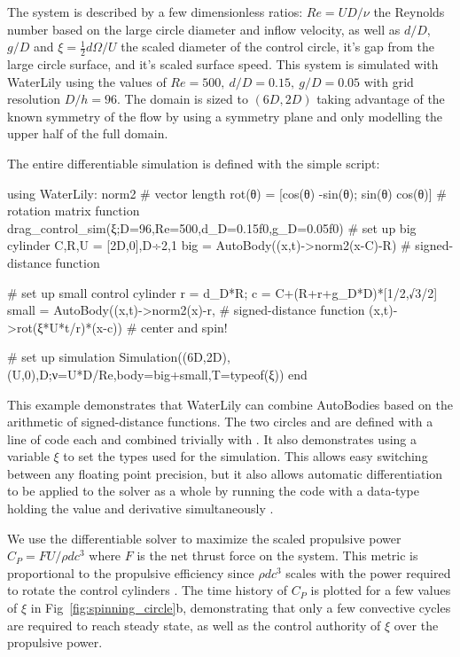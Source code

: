 \documentclass[final,3p,times]{elsarticle}
\begin{document}
The system is described by a few dimensionless ratios: $Re=UD/\nu$ the Reynolds number based on the large circle diameter and inflow velocity, as well as $d/D$, $g/D$ and $\xi=\frac 12 d\Omega/U$ the scaled diameter of the control circle, it's gap from the large circle surface, and it's scaled surface speed. This system is simulated with WaterLily using the values of $Re=500,\ d/D=0.15,\ g/D=0.05$ with grid resolution $D/h=96$. The domain is sized to $(6D,2D)$ taking advantage of the known symmetry of the flow by using a symmetry plane and only modelling the upper half of the full domain.

The entire differentiable simulation is defined with the simple script:
\begin{jllisting}
using WaterLily: norm2                   # vector length
rot(θ) = [cos(θ) -sin(θ); sin(θ) cos(θ)] # rotation matrix
function drag_control_sim(ξ;D=96,Re=500,d_D=0.15f0,g_D=0.05f0)
    # set up big cylinder
    C,R,U = [2D,0],D÷2,1
    big = AutoBody((x,t)->norm2(x-C)-R)         # signed-distance function

    # set up small control cylinder
    r = d_D*R; c = C+(R+r+g_D*D)*[1/2,√3/2]
    small = AutoBody((x,t)->norm2(x)-r,         # signed-distance function
                     (x,t)->rot(ξ*U*t/r)*(x-c)) # center and spin!

    # set up simulation
    Simulation((6D,2D),(U,0),D;ν=U*D/Re,body=big+small,T=typeof(ξ))
end
\end{jllisting}
This example demonstrates that WaterLily can combine AutoBodies based on the arithmetic of signed-distance functions. The two circles  and  are defined with a line of code each and combined trivially with . It also demonstrates using a variable $\xi$ to set the types used for the simulation. This allows easy switching between any floating point precision, but it also allows automatic differentiation to be applied to the solver as a whole by running the code with a  data-type holding the value and derivative simultaneously \cite{RevelsLubinPapamarkou2016}.

We use the differentiable solver to maximize the scaled propulsive power $C_P = FU/\rho dc^3$ where $F$ is the net thrust force on the system. This metric is  proportional to the propulsive efficiency since $\rho dc^3$ scales with the power required to rotate the control cylinders \cite{schulmeister2017}. The time history of $C_P$ is plotted for a few values of $\xi$ in Fig~\ref{fig:spinning_circle}b, demonstrating that only a few convective cycles are required to reach steady state, as well as the control authority of $\xi$ over the propulsive power.
\end{document}
